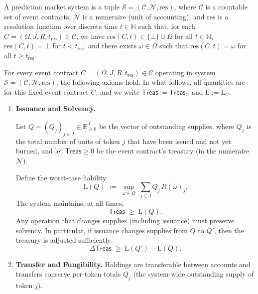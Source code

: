 \begin{definition}\label{def:system}
A prediction market system is a tuple $\mathcal{S}=(\mathcal{C},\mathcal{N},\mathrm{res})$, where $\mathcal{C}$ is a countable set of event contracts, $\mathcal{N}$ is a numeraire (unit of accounting), and $\mathrm{res}$ is a resolution function over discrete time $t\in\mathbb{N}$ such that, for each $C=(\Omega,J,R,t_{\mathrm{res}})\in\mathcal{C}$, we have $\mathrm{res}(C,t)\in\{\bot\}\cup\Omega$ for all $t\in\mathbb{N}$, $\mathrm{res}(C,t)=\bot$ for $t<t_{\mathrm{res}}$, and there exists $\omega\in\Omega$ such that $\mathrm{res}(C,t)=\omega$ for all $t\ge t_{\mathrm{res}}$.
\end{definition}

\begin{definition}\label{def:axioms} For every event contract $C=(\Omega,J,R,t_{\mathrm{res}})\in\mathcal{C}$ operating in system $\mathcal{S}=(\mathcal{C},\mathcal{N},\mathrm{res})$, the following axioms hold. In what follows, all quantities are for this fixed event contract $C$, and we write $\mathsf{Treas}:=\mathsf{Treas}_C$ and $\mathrm{L}:=\mathrm{L}_C$.

\begin{enumerate}

\item \textbf{Issuance and Solvency.}

Let $Q=(Q_j)_{j\in J}\in\mathbb{R}_{\ge 0}^{J}$ be the vector of outstanding supplies, where $Q_j$ is the total number of units of token $j$ that have been issued and not yet burned, and let $\mathsf{Treas}\ge 0$ be the event contract’s treasury (in the numeraire $\mathcal{N}$).

Define the worst-case liability
\begin{equation}
  \mathrm{L}(Q) \;:=\; \sup_{\omega\in\Omega}\; \sum_{j\in J} Q_j\,R(\omega)_j.
\end{equation}
The system maintains, at all times,
\begin{equation}
  \mathsf{Treas} \;\ge\; \mathrm{L}(Q).
\end{equation}
Any operation that changes supplies (including issuance) must preserve solvency. In particular, if issuance changes supplies from $Q$ to $Q'$, then the treasury is adjusted sufficiently:
\begin{equation}
  \Delta \mathsf{Treas} \;\ge\; \mathrm{L}(Q') - \mathrm{L}(Q).
\end{equation}

\item \textbf{Transfer and Fungibility.}
Holdings are transferable between accounts and transfers conserve per-token totals $Q_j$ (the system-wide outstanding supply of token $j$).


\end{enumerate}
\end{definition}
